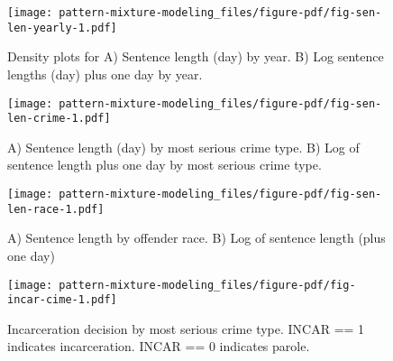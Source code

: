 \documentclass[
  letterpaper,
  DIV=11,
  numbers=noendperiod]{scrartcl}
\begin{document}
\begin{figure}

{\centering \texttt{[image: pattern-mixture-modeling\_files/figure-pdf/fig-sen-len-yearly-1.pdf]}

}

\caption{\label{fig-sen-len-yearly}Density plots for A) Sentence length
(day) by year. B) Log sentence lengths (day) plus one day by year.}

\end{figure}

\begin{figure}

{\centering \texttt{[image: pattern-mixture-modeling\_files/figure-pdf/fig-sen-len-crime-1.pdf]}

}

\caption{\label{fig-sen-len-crime}A) Sentence length (day) by most
serious crime type. B) Log of sentence length plus one day by most
serious crime type.}

\end{figure}

\begin{figure}

{\centering \texttt{[image: pattern-mixture-modeling\_files/figure-pdf/fig-sen-len-race-1.pdf]}

}

\caption{\label{fig-sen-len-race}A) Sentence length by offender race. B)
Log of sentence length (plus one day)}

\end{figure}

\begin{figure}

{\centering \texttt{[image: pattern-mixture-modeling\_files/figure-pdf/fig-incar-cime-1.pdf]}

}

\caption{\label{fig-incar-cime}Incarceration decision by most serious
crime type. INCAR == 1 indicates incarceration. INCAR == 0 indicates
parole.}

\end{figure}
\end{document}
